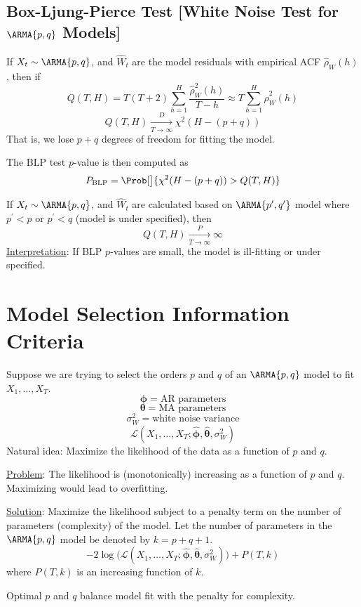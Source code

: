 \subsection*{Box-Ljung-Pierce Test [White Noise Test for $ \ARMA{p,q} $ Models]}
If $ X_t \sim \ARMA{p,q} $, and $ \hat{W}_t $ are the model residuals
with empirical ACF $ \hat{\rho}_W(h) $, then if
\[ Q(T,H)=T(T+2)\sum_{h=1}^{H} \frac{\hat{\rho}_W^2(h)}{T-h}\approx
    T \sum_{h=1}^{H} \hat{\rho}_W^2(h)  \]
\[ Q(T,H)\xrightarrow[T\to\infty]{D}\chi^2(H-(p+q)) \]
That is, we lose $ p+q $ degrees of freedom for fitting the model.

The BLP test $ p $-value is then computed as
\[ P_{\text{BLP}}=\Prob[\big]{\chi^2(H-(p+q))>Q(T,H)} \]

\begin{Remark}{}{}
    If $ X_t \sim \ARMA{p,q} $, and $ \hat{W}_t $
    are calculated based on $ \ARMA{p^\prime,q^\prime} $ model
    where $ p^\prime <p $ or $ p^\prime <q $ (model is under specified),
    then
    \[ Q(T,H)\xrightarrow[T\to\infty]{P}\infty \]
    \underline{Interpretation}: If BLP $ p $-values are small,
    the model is ill-fitting or under specified.
\end{Remark}

\section{Model Selection Information Criteria}
Suppose we are trying to select the orders $ p $ and
$ q $ of an $ \ARMA{p,q} $ model to fit $ X_1,\ldots,X_T $.
\[ \symbf{\phi}=\text{AR parameters} \]
\[ \symbf{\theta}=\text{MA parameters} \]
\[ \sigma_W^2=\text{white noise variance} \]
\[ \mathcal{L}(X_1,\ldots,X_T;\hat{\symbf{\phi}},\hat{\symbf{\theta}},\sigma_W^2) \]
Natural idea: Maximize the likelihood of the data as a function of
$ p $ and $ q $.

\underline{Problem}: The likelihood is (monotonically)
increasing as a function of $ p $ and $ q $. Maximizing would lead
to overfitting.

\underline{Solution}: Maximize the likelihood subject to a
penalty term on the number of parameters (complexity)
of the model. Let the number of parameters
in the $ \ARMA{p,q} $ model be denoted by $ k=p+q+1 $.
\[ -2\log\bigl(\mathcal{L}(X_1,\ldots,X_T;\hat{\symbf{\phi}},\hat{\symbf{\theta}},\sigma_W^2)\bigr)+P(T,k) \]
where $ P(T,k) $ is an increasing function of $ k $.

Optimal $ p $ and $ q $ balance model fit with the penalty for complexity.

